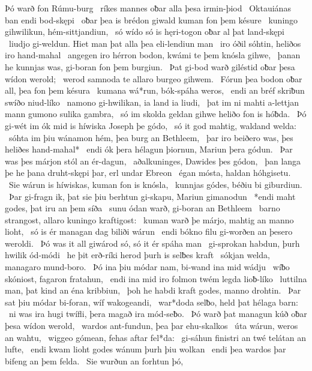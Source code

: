 Þó warð fon Rúmu-burg \hld\ ríkes mannes
oƀar alla þesa irmin-þiod \hld\ Oktauiánas
ban endi bod-skępi \hld\ oƀar þea is brédon giwald
kuman fon þem késure \hld\ kuningo gihwilikun,
hém-sittjandiun, \hld\ só wído só is hęri-togon
oƀar al þat land-skępi \hld\ liudjo gi-weldun.
Hiet man þat alla þea eli-lendiun man \hld\ iro óðil sóhtin,
heliðos iro hand-mahal \hld\ angegen iro hérron bodon,
kwámi te þem knósla gihwe, \hld\ þanan he kunnjas was,
gi-boran fon þem burgiun. \hld\ Þat gi-bod warð giléstid
oƀar þesa wídon werold; \hld\ werod samnoda
te allaro burgeo gihwem. \hld\ Fórun þea bodon oƀar all,
þea fon þem késura \hld\ kumana wá*run,
bók-spáha weros, \hld\ endi an bréf skriƀun
swíðo niud-líko \hld\ namono gi-hwilikan,
ia land ia liudi, \hld\ þat im ni mahti a-lettjan mann
gumono sulika gambra, \hld\ só im skolda geldan gihwe
heliðo fon is hóƀda. \hld\ Þó gi-wét im ók mid is híwiska
Joseph þe gódo, \hld\ só it god mahtig,
waldand welda: \hld\ sóhta im þiu wánamon hém,
þea burg an Bethleem, \hld\ þar iro beiðero was,
þes heliðes hand-mahal* \hld\ endi ók þera hélagun þiornun,
Mariun þera gódun. \hld\ Þar was þes márjon stól
an ér-dagun, \hld\ aðalkuninges,
Dawides þes gódon, \hld\ þan langa þe he þana druht-skępi þar,
erl undar Ebreon \hld\ égan mósta,
haldan hóhgisetu. \hld\ Sie wárun is híwiskas,
kuman fon is knósla, \hld\ kunnjas gódes,
béðiu bi giburdiun. \hld\ Þar gi-fragn ik, þat sie þiu berhtun gi-skapu,
Mariun gimanodun \hld\ *endi maht godes,
þat iru an þem síða \hld\ sunu ódan warð,
gi-boran an Bethleem \hld\ barno strangost,
allaro kuningo kraftigost: \hld\ kuman warð þe márjo,
mahtig an manno lioht, \hld\ só is ér managan dag
biliði wárun \hld\ endi bókno filu
gi-worðen an þesero weroldi. \hld\ Þó was it all giwárod só,
só it ér spáha man \hld\ gi-sprokan habdun,
þurh hwilik ód-módi \hld\ he þit erð-ríki herod
þurh is selƀes kraft \hld\ sókjan welda,
managaro mund-boro. \hld\ Þó ina þiu módar nam,
bi-wand ina mid wádju \hld\ wíƀo skóniost,
fagaron fratahun, \hld\ endi ina mid iro folmon twém
legda lioƀ-líko \hld\ luttilna man,
þat kind an éna kribbiun, \hld\ þoh he habdi kraft godes,
manno drohtin. \hld\ Þar sat þiu módar bi-foran,
wíf wakogeandi, \hld\ war*doda selƀo,
held þat hélaga barn: \hld\ ni was ira hugi twífli,
þera magað ira mód-seƀo. \hld\ Þó warð þat managun kúð
oƀar þesa wídon werold, \hld\ wardos ant-fundun,
þea þar ehu-skalkos \hld\ úta wárun,
weros an wahtu, \hld\ wiggeo gómean,
fehas aftar fel*da: \hld\ gi-sáhun finistri an twé
telátan an lufte, \hld\ endi kwam lioht godes
wánum þurh þiu wolkan \hld\ endi þea wardos þar
bifeng an þem felda. \hld\ Sie wurðun an forhtun þó,
